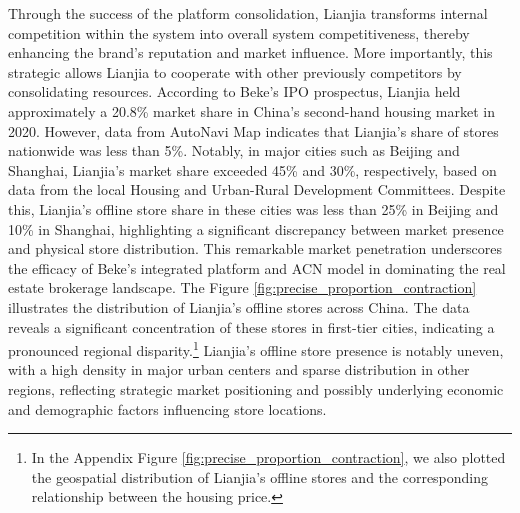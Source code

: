 \documentclass[11pt]{article}
\begin{document}
Through the success of the platform consolidation, Lianjia transforms internal competition within the system into overall system competitiveness, thereby enhancing the brand's reputation and market influence. More importantly, this strategic allows Lianjia to cooperate with other previously competitors by consolidating resources. According to Beke's IPO prospectus, Lianjia held approximately a 20.8\% market share in China's second-hand housing market in 2020. However, data from AutoNavi Map indicates that Lianjia's share of stores nationwide was less than 5\%. Notably, in major cities such as Beijing and Shanghai, Lianjia's market share exceeded 45\% and 30\%, respectively, based on data from the local Housing and Urban-Rural Development Committees. Despite this, Lianjia's offline store share in these cities was less than 25\% in Beijing and 10\% in Shanghai, highlighting a significant discrepancy between market presence and physical store distribution. This remarkable market penetration underscores the efficacy of Beke's integrated platform and ACN model in dominating the real estate brokerage landscape. The Figure \ref{fig:precise_proportion_contraction} illustrates the distribution of Lianjia's offline stores across China. The data reveals a significant concentration of these stores in first-tier cities, indicating a pronounced regional disparity.\footnote{In the Appendix Figure \ref{fig:precise_proportion_contraction}, we also plotted the geospatial distribution of Lianjia's offline stores and the corresponding relationship between the housing price.} Lianjia's offline store presence is notably uneven, with a high density in major urban centers and sparse distribution in other regions, reflecting strategic market positioning and possibly underlying economic and demographic factors influencing store locations.  %





\end{document}
